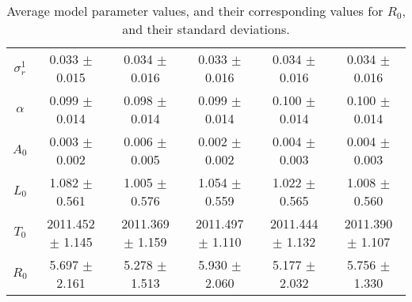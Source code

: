 \begin{sidewaystable}
\begin{tabular}{cccccc}
{\bf $\sigma^1_r$} & 0.033 $\pm$ 0.015 & 0.034 $\pm$ 0.016 & 0.033 $\pm$ 0.016 & 0.034 $\pm$ 0.016 & 0.034 $\pm$ 0.016 \\
{\bf $\alpha$} & 0.099 $\pm$ 0.014 & 0.098 $\pm$ 0.014 & 0.099 $\pm$ 0.014 & 0.100 $\pm$ 0.014 & 0.100 $\pm$ 0.014 \\
{\bf $A_0$} & 0.003 $\pm$ 0.002 & 0.006 $\pm$ 0.005 & 0.002 $\pm$ 0.002 & 0.004 $\pm$ 0.003 & 0.004 $\pm$ 0.003 \\
{\bf $L_0$} & 1.082 $\pm$ 0.561 & 1.005 $\pm$ 0.576 & 1.054 $\pm$ 0.559 & 1.022 $\pm$ 0.565 & 1.008 $\pm$ 0.560 \\
{\bf $T_0$} & 2011.452 $\pm$ 1.145 & 2011.369 $\pm$ 1.159 & 2011.497 $\pm$ 1.110 & 2011.444 $\pm$ 1.132 & 2011.390 $\pm$ 1.107 \\
{\bf $R_0$} & 5.697 $\pm$ 2.161& 5.278 $\pm$ 1.513& 5.930 $\pm$ 2.060& 5.177 $\pm$ 2.032& 5.756 $\pm$ 1.330\\
\hline\hline
\end{tabular}
\caption{Average model parameter values, and their corresponding values for $R_0$,  and their standard deviations.}
\label{Table:Parameter_Values}
\end{sidewaystable}
